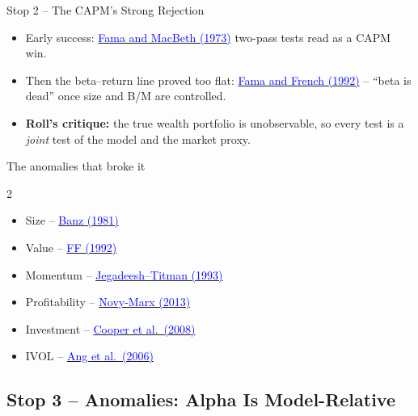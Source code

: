 \documentclass{beamer}
\begin{document}
\begin{frame}{Stop 2 -- The CAPM's Strong Rejection}
\begin{itemize}
  \item Early \alert{success}: \href{https://www.journals.uchicago.edu/doi/abs/10.1086/260061}{\textcolor{blue}{Fama and MacBeth (1973)}} two-pass tests read as a CAPM win.
  \item Then the beta--return line proved \alert{too flat}: \href{https://onlinelibrary.wiley.com/doi/10.1111/j.1540-6261.1992.tb04398.x}{\textcolor{blue}{Fama and French (1992)}} -- ``beta is dead'' once size and B/M are controlled.
  \item \textbf{Roll's critique:} the true wealth portfolio is unobservable, so every test is a \textit{joint} test of the model and the market proxy.
\end{itemize}
\begin{block}{The anomalies that broke it}
\begin{multicols}{2}
\begin{itemize}\small
  \item Size -- \href{https://doi.org/10.1016/0304-405X(81)90018-0}{\textcolor{blue}{Banz (1981)}}
  \item Value -- \href{https://onlinelibrary.wiley.com/doi/10.1111/j.1540-6261.1992.tb04398.x}{\textcolor{blue}{FF (1992)}}
  \item Momentum -- \href{https://doi.org/10.1111/j.1540-6261.1993.tb04702.x}{\textcolor{blue}{Jegadeesh--Titman (1993)}}
  \item Profitability -- \href{https://doi.org/10.1016/j.jfineco.2013.01.003}{\textcolor{blue}{Novy-Marx (2013)}}
  \item Investment -- \href{https://doi.org/10.1111/j.1540-6261.2008.01370.x}{\textcolor{blue}{Cooper et al.\ (2008)}}
  \item IVOL -- \href{https://doi.org/10.1111/j.1540-6261.2006.00836.x}{\textcolor{blue}{Ang et al.\ (2006)}}
\end{itemize}
\end{multicols}
\end{block}
\end{frame}

\subsection{Stop 3 -- Anomalies: Alpha Is Model-Relative}
\end{document}
